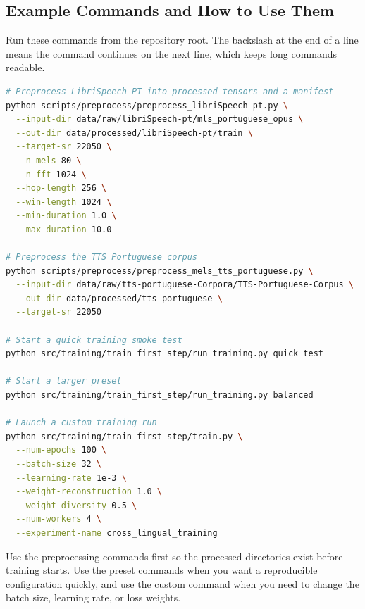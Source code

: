 \documentclass[11pt]{article}
\begin{document}
\subsection{Example Commands and How to Use Them}
Run these commands from the repository root. The backslash at the end of a line means the command continues on the next line, which keeps long commands readable.

\begin{lstlisting}[language=bash]
# Preprocess LibriSpeech-PT into processed tensors and a manifest
python scripts/preprocess/preprocess_libriSpeech-pt.py \
  --input-dir data/raw/libriSpeech-pt/mls_portuguese_opus \
  --out-dir data/processed/libriSpeech-pt/train \
  --target-sr 22050 \
  --n-mels 80 \
  --n-fft 1024 \
  --hop-length 256 \
  --win-length 1024 \
  --min-duration 1.0 \
  --max-duration 10.0

# Preprocess the TTS Portuguese corpus
python scripts/preprocess/preprocess_mels_tts_portuguese.py \
  --input-dir data/raw/tts-portuguese-Corpora/TTS-Portuguese-Corpus \
  --out-dir data/processed/tts_portuguese \
  --target-sr 22050

# Start a quick training smoke test
python src/training/train_first_step/run_training.py quick_test

# Start a larger preset
python src/training/train_first_step/run_training.py balanced

# Launch a custom training run
python src/training/train_first_step/train.py \
  --num-epochs 100 \
  --batch-size 32 \
  --learning-rate 1e-3 \
  --weight-reconstruction 1.0 \
  --weight-diversity 0.5 \
  --num-workers 4 \
  --experiment-name cross_lingual_training
\end{lstlisting}

Use the preprocessing commands first so the processed directories exist before training starts. Use the preset commands when you want a reproducible configuration quickly, and use the custom command when you need to change the batch size, learning rate, or loss weights.
\end{document}
